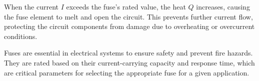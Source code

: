 When the current \( I \) exceeds the fuse's rated value, the heat \( Q \) increases, causing the fuse element to melt and open the circuit. This prevents further current flow, protecting the circuit components from damage due to overheating or overcurrent conditions.

Fuses are essential in electrical systems to ensure safety and prevent fire hazards. They are rated based on their current-carrying capacity and response time, which are critical parameters for selecting the appropriate fuse for a given application.


